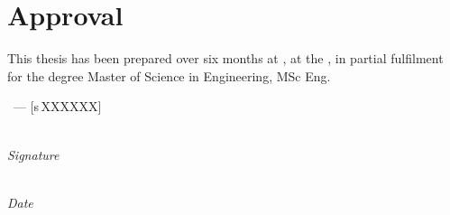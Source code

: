 \chapter*{Approval}
\thispagestyle{plain}

This thesis has been prepared over six months at \thesisdepartment, at the
\thesisuniversity, in partial fulfilment for the degree Master of Science in
Engineering, MSc Eng.

\vfill

\begin{center}
\thesisauthor\ --- [s\,XXXXXX]

\vspace{2.5cm}

\makebox[6cm]{\dotfill}\\[4pt]
\textit{Signature}

\vspace{2cm}

\makebox[6cm]{\dotfill}\\[4pt]
\textit{Date}
\end{center}

\vfill
